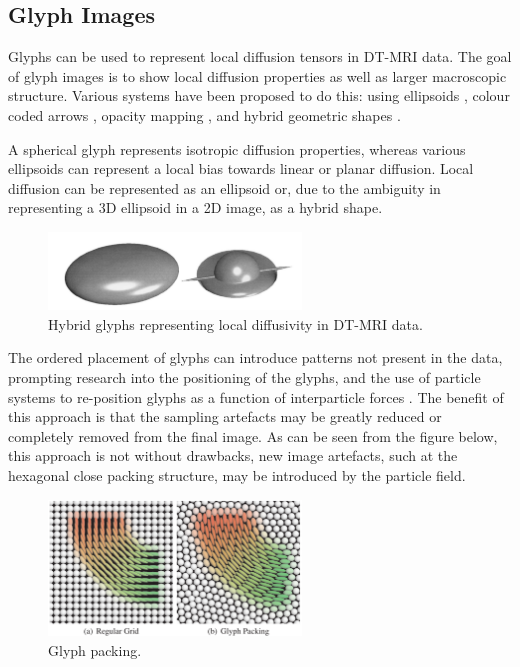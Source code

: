 \documentclass[MSc,paper=a4,pagesize=auto]{icldt}
\begin{document}
\subsection{Glyph Images}
Glyphs can be used to represent local diffusion tensors in DT-MRI data. The goal of glyph images is to show local diffusion properties as well as larger macroscopic structure. Various systems have been proposed to do this: using ellipsoids \cite{Pierpaoli1996}, colour coded arrows \cite{Peled1998}, opacity mapping \cite{Westin1997}, and hybrid geometric shapes \cite{Westin2002}. 

A spherical glyph represents isotropic diffusion properties, whereas various ellipsoids can represent a local bias towards linear or planar diffusion. Local diffusion can be represented as an ellipsoid or, due to the ambiguity in representing a 3D ellipsoid in a 2D image, as a hybrid shape.

\begin{figure}[htbp!]
    \centering
    \includegraphics[width=0.6\textwidth]{resources/hybrid_glyphs}
    \caption{Hybrid glyphs representing local diffusivity in DT-MRI data. \cite{Westin2002}}
    \label{fig:hybrid_glyphs}
\end{figure}

The ordered placement of glyphs can introduce patterns not present in the data, prompting research into the positioning of the glyphs, and the use of particle systems to re-position glyphs as a function of interparticle forces \cite{Kindlmann2006}. The benefit of this approach is that the sampling artefacts may be greatly reduced or completely removed from the final image. As can be seen from the figure below, this approach is not without drawbacks, new image artefacts, such at the hexagonal close packing structure, may be introduced by the particle field. 

\begin{figure}[htbp!]
    \centering
    \includegraphics[width=0.6\textwidth]{resources/glyph_packing}
    \caption{Glyph packing. \cite{Kindlmann2006}}
    \label{fig:glyph_packing}
\end{figure}
\end{document}
